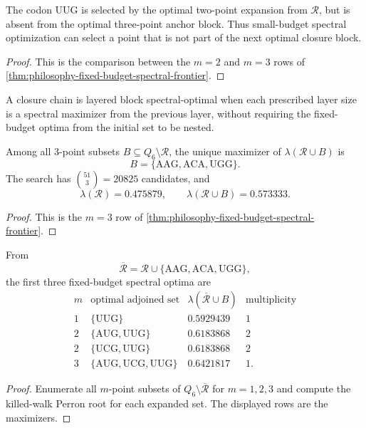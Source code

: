 \begin{corollary}
\label{cor:philosophy-spectral-budget-frustration}
The codon $\mathrm{UUG}$ is selected by the optimal two-point expansion
from $\mathcal{R}$, but is absent from the optimal three-point anchor
block. Thus small-budget spectral optimization can select a point that
is not part of the next optimal closure block.
\end{corollary}
\begin{proof}
This is the comparison between the $m=2$ and $m=3$ rows of
\autoref{thm:philosophy-fixed-budget-spectral-frontier}.
\end{proof}

\begin{definition}
\label{def:philosophy-layered-block-spectral-optimality}
A closure chain is layered block spectral-optimal when each prescribed
layer size is a spectral maximizer from the previous layer, without
requiring the fixed-budget optima from the initial set to be nested.
\end{definition}

\begin{theorem}
\label{thm:philosophy-anchor-triple-spectral-optimality}
Among all $3$-point subsets $B\subseteq Q_{6}\setminus\mathcal{R}$,
the unique maximizer of $\lambda(\mathcal{R}\cup B)$ is
$$
  B=\{\mathrm{AAG},\mathrm{ACA},\mathrm{UGG}\}.
$$
The search has $\binom{51}{3}=20825$ candidates, and
$$
  \lambda(\mathcal{R})=0.475879,\qquad
  \lambda(\mathcal{R}\cup B)=0.573333.
$$
\end{theorem}
\begin{proof}
This is the $m=3$ row of
\autoref{thm:philosophy-fixed-budget-spectral-frontier}.
\end{proof}

\begin{theorem}
\label{thm:philosophy-anchor-layer-spectral-frontier}
From
$$
  \overline{\mathcal{R}}
  =
  \mathcal{R}\cup\{\mathrm{AAG},\mathrm{ACA},\mathrm{UGG}\},
$$
the first three fixed-budget spectral optima are
$$
\begin{array}{c|l|r|r}
  m & \text{optimal adjoined set} & \lambda(\overline{\mathcal{R}}\cup B)
  & \text{multiplicity}\\
  \hline
  1 & \{\mathrm{UUG}\} & 0.5929439 & 1\\
  2 & \{\mathrm{AUG},\mathrm{UUG}\} & 0.6183868 & 2\\
  2 & \{\mathrm{UCG},\mathrm{UUG}\} & 0.6183868 & 2\\
  3 & \{\mathrm{AUG},\mathrm{UCG},\mathrm{UUG}\} & 0.6421817 & 1.
\end{array}
$$
\end{theorem}
\begin{proof}
Enumerate all $m$-point subsets of
$Q_{6}\setminus\overline{\mathcal{R}}$ for $m=1,2,3$ and compute the
killed-walk Perron root for each expanded set. The displayed rows are
the maximizers.
\end{proof}

